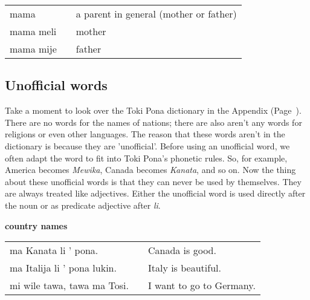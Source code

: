 \begin{supertabular}{p{5,5cm}|ll}
mama && a parent in general (mother or father) \\
mama meli && mother \\
mama mije && father \\
\end{supertabular} 

%
\subsection*{Unofficial words}
%
Take a moment to look over the Toki Pona dictionary in the Appendix (Page~\pageref{'unofficial_words'}). 
There are no words for the names of nations; there are also aren't any words for religions or even other languages. 
The reason that these words aren't in the dictionary is because they are 'unofficial'. 
Before using an unofficial word, we often adapt the word to fit into Toki Pona's phonetic rules. 
So, for example, America becomes \textit{Mewika}, Canada becomes \textit{Kanata}, and so on. 
Now the thing about these unofficial words is that they can never be used by themselves. 
They are always treated like adjectives. 
Either the unofficial word is used directly after the noun or as predicate adjective after \textit{li}. 

\textbf{country names}

\begin{supertabular}{p{5,5cm}|ll}
ma Kanata li ' pona. && Canada is good. \\
ma Italija li ' pona lukin. && Italy is beautiful. \\
mi wile tawa, tawa ma Tosi. && I want to go to Germany. \\
\end{supertabular} 

